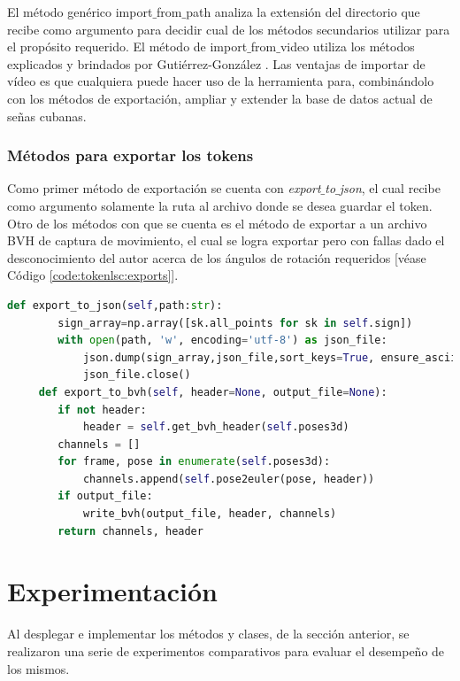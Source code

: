 El método genérico import$\_{}$from$\_{}$path analiza la extensión del directorio que recibe como argumento para decidir cual de los métodos secundarios utilizar para el propósito requerido. El método de import$\_{}$from$\_{}$video utiliza los métodos explicados y brindados por Gutiérrez-González . Las ventajas de importar de vídeo es que cualquiera puede hacer uso de la herramienta para, combinándolo con los métodos de exportación, ampliar y extender la base de datos actual de señas cubanas.

\subsubsection{Métodos para exportar los tokens}

Como primer método de exportación se cuenta con \textit{export$\_{}$to$\_{}$json}, el cual recibe como argumento solamente la ruta al archivo donde se desea guardar el token. Otro de los métodos con que se cuenta es el método de exportar a un archivo BVH de captura de movimiento, el cual se logra exportar pero con fallas dado el desconocimiento del autor acerca de los ángulos de rotación requeridos [véase Código \ref{code:tokenlsc:exports}].

\begin{lstlisting}[basicstyle=\tiny,language=Python, caption={Métodos estático para exportar tokens de la clase TokenLSC}, label={code:tokenlsc:exports}] 
 	def export_to_json(self,path:str):
        sign_array=np.array([sk.all_points for sk in self.sign])
        with open(path, 'w', encoding='utf-8') as json_file:
            json.dump(sign_array,json_file,sort_keys=True, ensure_ascii=False)
            json_file.close() 
 	 def export_to_bvh(self, header=None, output_file=None):
        if not header:
            header = self.get_bvh_header(self.poses3d)
        channels = []
        for frame, pose in enumerate(self.poses3d):
            channels.append(self.pose2euler(pose, header))
        if output_file:
            write_bvh(output_file, header, channels)
        return channels, header
\end{lstlisting}

\section{Experimentación}
Al desplegar e implementar los métodos y clases, de la sección anterior, se realizaron una serie de experimentos comparativos para evaluar el desempeño de los mismos.

